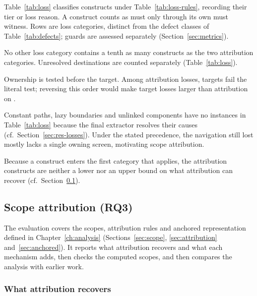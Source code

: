 Table~\ref{tab:loss} classifies \RoundTwoInScopeAll{} constructs under
Table~\ref{tab:loss-rules}, recording their tier or loss reason. A construct counts as must only
through its own must witness. Rows are loss categories, distinct from the defect classes of
Table~\ref{tab:defects}; guards are assessed separately (Section~\ref{sec:metrics}).

\begin{table}[t]\small
\caption{Outcome of every navigation construct, baseline.}
\label{tab:loss}
\TabLoss
\par{}
\end{table}

No other loss category contains a tenth as many constructs as the two attribution categories. Unresolved destinations are counted separately (Table~\ref{tab:loss}).

Ownership is tested before the target. Among attribution losses, \AttrNonLiteral{} targets fail the
literal test; reversing this order would make target losses larger than attribution on
\AttrOrderFlipWhere{}.

Constant paths, lazy boundaries and unlinked components have no instances in Table~\ref{tab:loss}
because the final extractor resolves their causes (cf.~Section~\ref{sec:res-losses}). Under the stated
precedence, the navigation still lost mostly lacks a single owning screen, motivating
scope attribution.

Because a construct enters the first category that applies, the \AttrLost{} attribution constructs are neither a lower nor an upper bound on what attribution can recover (cf.~Section~\ref{sec:res-after}).

\subsection{Scope attribution (RQ3)}
\label{sec:res-after}

The evaluation covers the scopes, attribution rules and anchored representation defined in
Chapter~\ref{ch:analysis} (Sections~\ref{sec:scope}, \ref{sec:attribution} and~\ref{sec:anchored}).
It reports what attribution recovers and what each mechanism adds, then checks the computed scopes,
and then compares the analysis with earlier work.

\subsubsection{What attribution recovers}
\label{sec:res-recovers}

